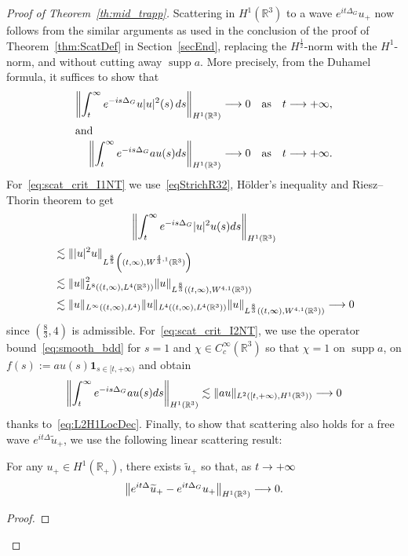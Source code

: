 \documentclass[AHL,Unicode,longabstracts,published]{cedram}
\newcommand*\R{\mathbb{R}}
\DeclareMathOperator{\supp}{supp}
\renewcommand*{\to}{\mathchoice{\longrightarrow}{\rightarrow}{\rightarrow}{\rightarrow}}
\begin{document}
\begin{proof}[Proof of Theorem~\ref{th:mid_trapp}]
Scattering in $H^1(\R^3)$ to a wave $e^{it\Delta_G}u_+$ now follows from the similar arguments as used in the conclusion of the proof of Theorem~\ref{thm:ScatDef} in Section~\ref{secEnd}, replacing the $H^{\frac 12} $-norm with the $H^1 $-norm, and without cutting away $\supp a$. More precisely, from the Duhamel formula, it suffices to show that
\begin{align}
\left\| \int_t^\infty e^{-is\Delta_G}u|u|^{2}(s) \, ds \right\|_{H^{1}(\R^3)} &\to 0 \quad\text{as}\quad t\to +\infty,
\label{eq:scat_crit_I1NT}
\\
\intertext{and}
\left\| \int_t^\infty e^{-is\Delta_G} a u(s) ds \right\|_{H^{1}(\R^3)} &\to 0 \quad\text{as}\quad t\to +\infty.
\label{eq:scat_crit_I2NT}
\end{align}
For~\eqref{eq:scat_crit_I1NT} we use~\eqref{eqStrichR32}, H{\"o}lder's inequality and Riesz--Thorin theorem to get
\begin{multline*}
\left\| \int_t^\infty e^{-is\Delta_G} |u|^2 u(s) ds \right\|_{H^{1}(\R^3)}\\
\begin{aligned}
&\lesssim \| |u|^2 u \|_{L^\frac{8}{5}\left((t,\infty), W^{\frac{4}{3},1}(\R^3)\right)} \\
&\lesssim \| u \|_{L^8\left((t,\infty),L^4(\R^3)\right)}^2 \| u \|_{L^\frac{8}{3}\left((t,\infty), W^{4,1}(\R^3)\right)} \\
&\lesssim \| u \|_{L^\infty((t,\infty),L^4)} \| u \|_{L^4\left((t,\infty),L^4(\R^3)\right)} \| u \|_{L^\frac{8}{3}\left((t,\infty), W^{4,1}(\R^3)\right)} \to 0
\end{aligned}
\end{multline*}
since $(\frac{8}{3},4)$ is admissible. For~\eqref{eq:scat_crit_I2NT}, we use the operator bound~\eqref{eq:smooth_bdd} for $s=1$ and $\chi \in C^\infty_c(\R^3)$ so that $\chi = 1$ on $\supp a$, on $f(s) := au(s) \mathbf 1_{s \in [t, +\infty)}$ and obtain
\[
\left\| \int_t^\infty e^{-is\Delta_G} a u(s) ds \right\|_{H^{1}(\R^3)} \lesssim \| au \|_{L^2([t, + \infty), H^{1}(\R^3))} \to 0
\]
thanks to~\eqref{eq:L2H1LocDec}. Finally, to show that scattering also holds for a free wave $e^{it\Delta}\widetilde u_+$, we use the following linear scattering result:
\begin{lemm}
For any $u_+ \in H^1(\R_+)$, there exists $\widetilde u_+$ so that, as $t \to +\infty$
\[
\left\| e^{it\Delta}\widetilde u_+ - e^{it\Delta_G} u_+ \right\|_{H^1(\R^3)} \to 0.
\]
\end{lemm}
\begin{proof}

\end{proof}
\end{proof}
\end{document}
